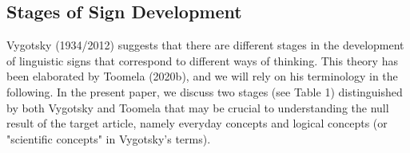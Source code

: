\documentclass[authordate, reflection]{jote-new-article}
\begin{document}
	\subsection{Stages of Sign Development}



	Vygotsky (1934/2012) suggests that there are different stages in the development of linguistic signs that correspond to different ways of thinking. This theory has been elaborated by Toomela (2020b), and we will rely on his terminology in the following. In the present paper, we discuss two stages (see Table 1) distinguished by both Vygotsky and Toomela that may be crucial to understanding the null result of the target article, namely everyday concepts and logical concepts (or "scientific concepts" in Vygotsky's terms).
\end{document}
